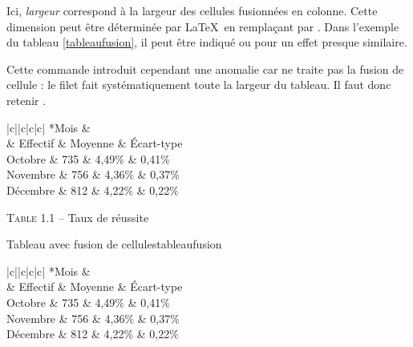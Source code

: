 Ici, \emph{largeur} correspond à la largeur des cellules fusionnées en colonne. Cette dimension peut être déterminée par \LaTeX\ en remplaçant  par \macron{*}. Dans l'exemple du tableau \ref{tableaufusion}, il peut être indiqué \macron{\{{1cm}\}} ou \macron{*} pour un effet presque similaire.

Cette  commande introduit cependant une anomalie car  ne traite pas la fusion de cellule : le filet fait systématiquement toute la largeur du tableau. Il faut donc retenir .

\begin{codedoublevrai}
\centering
\begin{tabular}{|c||c|c|c|}
\hline 
{}*{Mois} &     \\ 
                    & Effectif  & Moyenne   & \'{E}cart-type  \\ \hline \hline
Octobre             & 735       & 4,49\%    & 0,41\%          \\ \hline
Novembre            & 756       & 4,36\%    & 0,37\%          \\ \hline
Décembre            & 812       & 4,22\%    & 0,22\%          \\ \hline
\end{tabular}
\par\vspace{0.8\baselineskip} \textsc{Table 1.1} -- Taux de réussite
\end{codedoublevrai}

\begin{codedoublefaux}{Tableau avec fusion de cellules}{tableaufusion}
\begin{table}[!ht]
\centering
\begin{tabular}{|c||c|c|c|}
\hline 
{}*{Mois} &     \\ 
                    & Effectif  & Moyenne   & \'{E}cart-type  \\ \hline \hline
Octobre             & 735       & 4,49\%    & 0,41\%          \\ \hline
Novembre            & 756       & 4,36\%    & 0,37\%          \\ \hline
Décembre            & 812       & 4,22\%    & 0,22\%          \\ \hline
\end{tabular}
\caption{Taux de réussite}
\end{table}
\end{codedoublefaux}

